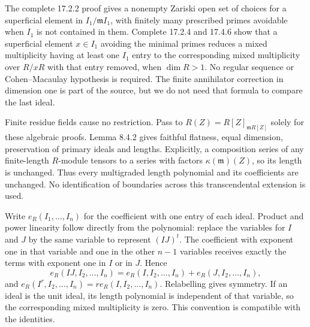 \documentclass[
  11pt,
]{article}
\begin{document}
The complete 17.2.2 proof gives a nonempty Zariski open set of choices
for a superficial element in \(I_1/\mathfrak m I_1\), with finitely many
prescribed primes avoidable when \(I_1\) is not contained in them.
Complete 17.2.4 and 17.4.6 show that a superficial element \(x\in I_1\)
avoiding the minimal primes reduces a mixed multiplicity having at least
one \(I_1\) entry to the corresponding mixed multiplicity over \(R/xR\)
with that entry removed, when \(\dim R>1\). No regular sequence or
Cohen--Macaulay hypothesis is required. The finite annihilator
correction in dimension one is part of the source, but we do not need
that formula to compare the last ideal.

Finite residue fields cause no restriction. Pass to
\(R(Z)=R[Z]_{\mathfrak m R[Z]}\) solely for these algebraic proofs.
Lemma 8.4.2 gives faithful flatness, equal dimension, preservation of
primary ideals and lengths. Explicitly, a composition series of any
finite-length \(R\)-module tensors to a series with factors
\(\kappa(\mathfrak m)(Z)\), so its length is unchanged. Thus every
multigraded length polynomial and its coefficients are unchanged. No
identification of boundaries across this transcendental extension is
used.

Write \(e_R(I_1,\ldots,I_n)\) for the coefficient with one entry of each
ideal. Product and power linearity follow directly from the polynomial:
replace the variables for \(I\) and \(J\) by the same variable to
represent \((IJ)^t\). The coefficient with exponent one in that variable
and one in the other \(n-1\) variables receives exactly the terms with
exponent one in \(I\) or in \(J\). Hence
\[e_R(IJ,I_2,\ldots,I_n)=e_R(I,I_2,\ldots,I_n)+e_R(J,I_2,\ldots,I_n),\]
and \(e_R(I^r,I_2,\ldots,I_n)=r e_R(I,I_2,\ldots,I_n)\). Relabelling
gives symmetry. If an ideal is the unit ideal, its length polynomial is
independent of that variable, so the corresponding mixed multiplicity is
zero. This convention is compatible with the identities.
\end{document}

